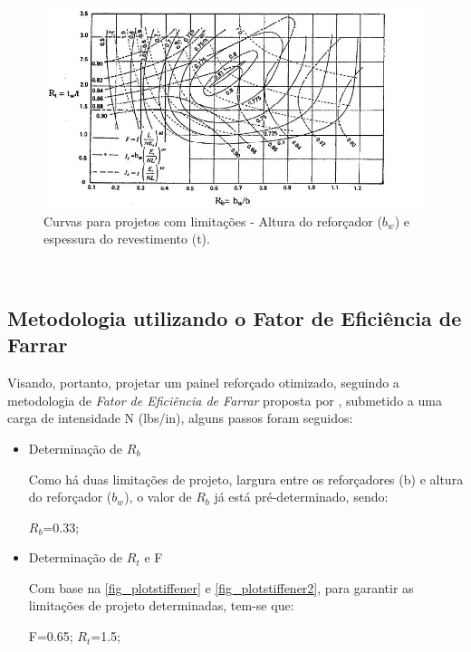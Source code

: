 {\begin{figure}[ht]
	\caption{\label{fig_plotstiffener2}Curvas para projetos com limitações - Altura do reforçador ($b_w$) e espessura do revestimento (t).}
  \centering
  \includegraphics[scale=0.8]{figura/PlotStiffener2}
\end{figure}
\

\subsection{Metodologia utilizando o Fator de Eficiência de Farrar}

Visando, portanto, projetar um painel reforçado otimizado, seguindo a metodologia de \emph{Fator de Eficiência de Farrar} proposta por \cite{niu1997airframe}, submetido a uma carga de intensidade N (lbs/in), alguns passos foram seguidos:

\begin{itemize}
\item Determinação de $R_b$ \

Como há duas limitações de projeto, largura entre os reforçadores (b) e altura do reforçador ($b_w$), o valor de $R_b$ já está pré-determinado, sendo:

$R_b$=0.33;\
\item Determinação de $R_t$ e F\

Com base na \autoref{fig_plotstiffener} e \autoref{fig_plotstiffener2}, para garantir as limitações de projeto determinadas, tem-se que:

F=0.65; $R_t$=1.5;


\end{itemize}}
